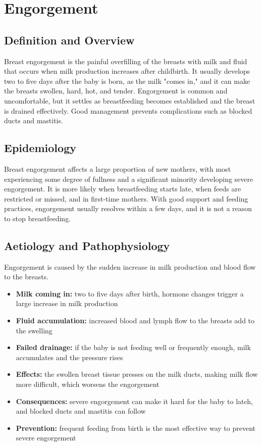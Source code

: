 \chapter{Engorgement}

\section*{Definition and Overview}
Breast engorgement is the painful overfilling of the breasts with milk and fluid that occurs when milk production increases after childbirth. It usually develops two to five days after the baby is born, as the milk "comes in," and it can make the breasts swollen, hard, hot, and tender. Engorgement is common and uncomfortable, but it settles as breastfeeding becomes established and the breast is drained effectively. Good management prevents complications such as blocked ducts and mastitis.

\section*{Epidemiology}
Breast engorgement affects a large proportion of new mothers, with most experiencing some degree of fullness and a significant minority developing severe engorgement. It is more likely when breastfeeding starts late, when feeds are restricted or missed, and in first-time mothers. With good support and feeding practices, engorgement usually resolves within a few days, and it is not a reason to stop breastfeeding.

\section*{Aetiology and Pathophysiology}
Engorgement is caused by the sudden increase in milk production and blood flow to the breasts.
\begin{itemize}
    \item \textbf{Milk coming in:} two to five days after birth, hormone changes trigger a large increase in milk production
    \item \textbf{Fluid accumulation:} increased blood and lymph flow to the breasts add to the swelling
    \item \textbf{Failed drainage:} if the baby is not feeding well or frequently enough, milk accumulates and the pressure rises
    \item \textbf{Effects:} the swollen breast tissue presses on the milk ducts, making milk flow more difficult, which worsens the engorgement
    \item \textbf{Consequences:} severe engorgement can make it hard for the baby to latch, and blocked ducts and mastitis can follow
    \item \textbf{Prevention:} frequent feeding from birth is the most effective way to prevent severe engorgement
\end{itemize}

